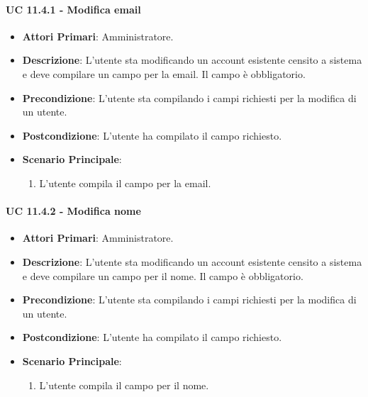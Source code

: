 				\paragraph{UC 11.4.1 - Modifica email}
				\begin{itemize}
					\item \textbf{Attori Primari}: Amministratore.
					\item \textbf{Descrizione}: L'utente sta modificando un account esistente censito a sistema e deve compilare un campo per la email. Il campo è obbligatorio.
					\item \textbf{Precondizione}: L'utente sta compilando i campi richiesti per la modifica di un utente.
					\item \textbf{Postcondizione}: L'utente ha compilato il campo richiesto.
					\item \textbf{Scenario Principale}:
					\begin{enumerate}
						\item{L'utente compila il campo per la email.}
					\end{enumerate}	
				\end{itemize}

				\paragraph{UC 11.4.2 - Modifica nome}
				\begin{itemize}
					\item \textbf{Attori Primari}: Amministratore.
					\item \textbf{Descrizione}: L'utente sta modificando un account esistente censito a sistema e deve compilare un campo per il nome. Il campo è obbligatorio.
					\item \textbf{Precondizione}: L'utente sta compilando i campi richiesti per la modifica di un utente.
					\item \textbf{Postcondizione}: L'utente ha compilato il campo richiesto.
					\item \textbf{Scenario Principale}:
					\begin{enumerate}
						\item{L'utente compila il campo per il nome.}
					\end{enumerate}	
				\end{itemize}

